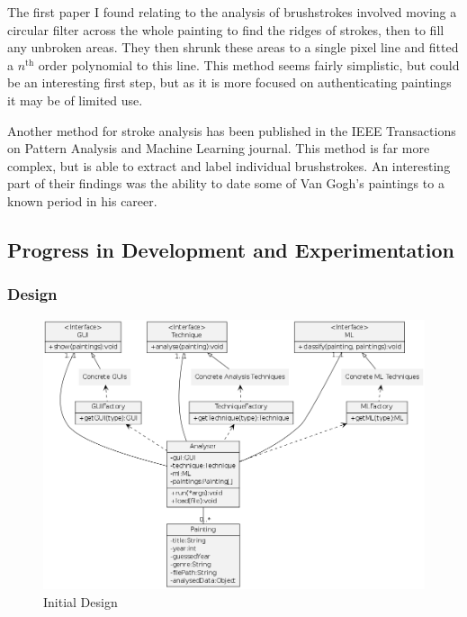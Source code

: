 \documentclass[11pt,fleqn,twoside]{article}
\begin{document}
The first paper I found relating to the analysis of brushstrokes involved moving a circular filter
across the whole painting to find the ridges of strokes, then to fill any unbroken areas. They then
shrunk these areas to a single pixel line and fitted a $n^{\text{th}}$ order polynomial to this
line\cite{Berezhnoy2005Authentic}. This method seems fairly simplistic, but could be an interesting
first step, but as it is more focused on authenticating paintings it may be of limited use.

Another method for stroke analysis has been published in the IEEE Transactions on Pattern Analysis
and Machine Learning journal. This method is far more complex, but is able to extract and label
individual brushstrokes. An interesting part of their findings was the ability to date some of Van
Gogh's paintings to a known period in his career\cite{Li2012Rhythmic}.

\clearpage
\subsection{Progress in Development and Experimentation}

\subsubsection{Design}
\begin{figure}[H]
\includegraphics[scale=0.5]{img/design.png}
\caption{Initial Design}
\label{fig:init-class}
\end{figure}
\end{document}
